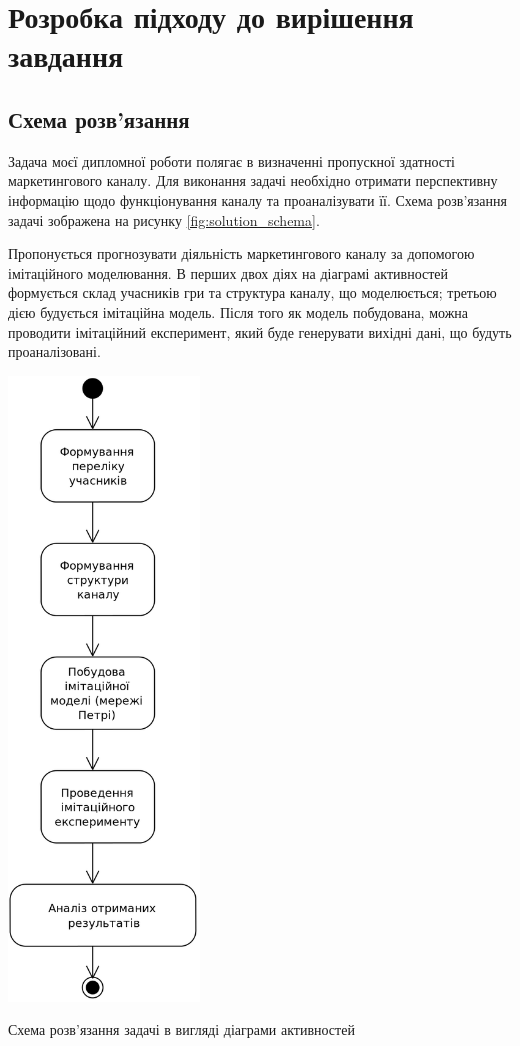 \section{Розробка підходу до вирішення завдання}


\subsection{Схема розв’язання}
Задача моєї дипломної роботи полягає в визначенні пропускної здатності маркетингового каналу. Для виконання задачі необхідно отримати перспективну інформацію щодо функціонування каналу та проаналізувати її. Схема розв’язання задачі зображена на рисунку \ref{fig:solution_schema}.

Пропонується прогнозувати діяльність маркетингового каналу за допомогою імітаційного моделювання. В перших двох діях на діаграмі активностей формується склад учасників гри та структура каналу, що моделюється; третьою дією будується імітаційна модель. Після того як модель побудована, можна проводити імітаційний експеримент, який буде генерувати вихідні дані, що будуть проаналізовані.

            \begin{stdfigure}
                \includegraphics[width=2in]{images/uml_act_solution_schema.png}
                \caption{Схема розв’язання задачі в вигляді діаграми активностей}
                \label{fig:solution_schema}
            \end{stdfigure}   
